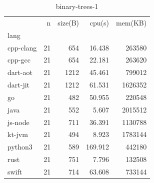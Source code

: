 \begin{table}[ht]
    \caption{binary-trees-1}
    \label{tab:binary-trees-1}
    \begin{center}
        \begin{tabular}{lrrrr}
            \toprule
            {}        & n  & size(B) & cpu(s)  & mem(KB) \\
            lang      &    &         &         &         \\
            \midrule
            cpp-clang & 21 & 654     & 16.438  & 263580  \\
            cpp-gcc   & 21 & 654     & 22.181  & 263620  \\
            dart-aot  & 21 & 1212    & 45.461  & 799012  \\
            dart-jit  & 21 & 1212    & 61.531  & 1626352 \\
            go        & 21 & 482     & 50.955  & 220548  \\
            java      & 21 & 552     & 5.607   & 2015512 \\
            js-node   & 21 & 711     & 36.391  & 1130788 \\
            kt-jvm    & 21 & 494     & 8.923   & 1783144 \\
            python3   & 21 & 589     & 169.912 & 442180  \\
            rust      & 21 & 751     & 7.796   & 132508  \\
            swift     & 21 & 714     & 63.608  & 733144  \\
            \bottomrule
        \end{tabular}
    \end{center}
\end{table}


